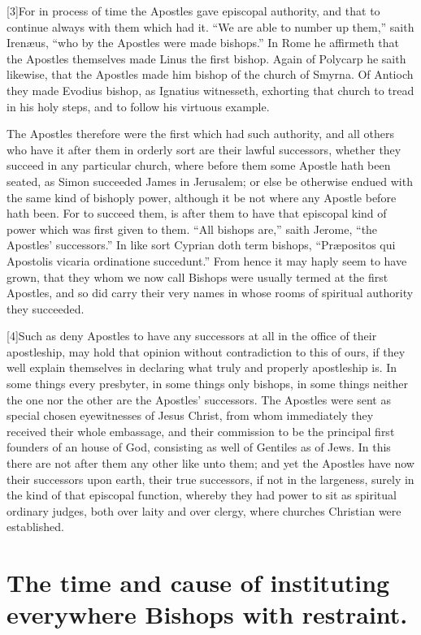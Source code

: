 [3]For in process of time the Apostles gave episcopal authority, and that to continue always with them which had it. “We are able to number up them,” saith Irenæus, “who by the Apostles were made bishops.” In Rome he affirmeth that the Apostles themselves made Linus the first bishop. Again of Polycarp he saith likewise, that the Apostles made him bishop of the church of Smyrna. Of Antioch they made Evodius bishop, as Ignatius witnesseth, exhorting that church to tread in his holy steps, and to follow his virtuous example.

The Apostles therefore were the first which had such authority, and all others who have it after them in orderly sort are their lawful successors, whether they succeed in any particular church, where before them some Apostle hath been  seated,
 as Simon succeeded James in Jerusalem; or else be otherwise endued with the same kind of bishoply power, although it be not where any Apostle before hath been. For to succeed them, is after them to have that episcopal kind of power which was first given to them. “All bishops are,” saith Jerome, “the Apostles’ successors.” In like sort Cyprian doth term bishops, “Præpositos qui Apostolis vicaria ordinatione succedunt.” From hence it may haply seem to have grown, that they whom we now call Bishops were usually termed at the first Apostles, and so did carry their very names in whose rooms of spiritual authority they succeeded.

[4]Such as deny Apostles to have any successors at all in the office of their apostleship, may hold that opinion without contradiction to this of ours, if they well explain themselves in declaring what truly and properly apostleship is. In some things every presbyter, in some things only bishops, in some things neither the one nor the other are the Apostles’ successors. The Apostles were sent as special chosen eyewitnesses of Jesus Christ, from whom immediately they received their whole embassage, and their commission to be the principal first founders of an house of God, consisting as well of Gentiles as of Jews. In this there are not after them any other like unto them; and yet the Apostles have now their successors upon earth, their true successors, if not in the largeness,  surely in the kind of that episcopal function,
 whereby they had power to sit as spiritual ordinary judges, both over laity and over clergy, where churches Christian were established.

\section*{The time and cause of instituting everywhere Bishops with restraint.}

